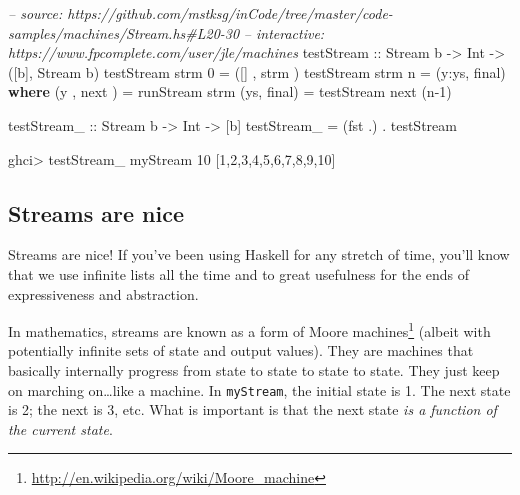 \documentclass[]{article}
\newenvironment{Shaded}{\begin{snugshade}}{\end{snugshade}}
\newcommand{\CommentTok}[1]{\textcolor[rgb]{0.56,0.35,0.01}{\textit{#1}}}
\newcommand{\DataTypeTok}[1]{\textcolor[rgb]{0.13,0.29,0.53}{#1}}
\newcommand{\DecValTok}[1]{\textcolor[rgb]{0.00,0.00,0.81}{#1}}
\newcommand{\FunctionTok}[1]{\textcolor[rgb]{0.00,0.00,0.00}{#1}}
\newcommand{\KeywordTok}[1]{\textcolor[rgb]{0.13,0.29,0.53}{\textbf{#1}}}
\newcommand{\NormalTok}[1]{#1}
\newcommand{\OtherTok}[1]{\textcolor[rgb]{0.56,0.35,0.01}{#1}}
\renewcommand{\href}[2]{#2\footnote{\url{#1}}}
\begin{document}
\begin{Shaded}
\begin{Highlighting}[]
\CommentTok{-- source: https://github.com/mstksg/inCode/tree/master/code-samples/machines/Stream.hs#L20-30}
\CommentTok{-- interactive: https://www.fpcomplete.com/user/jle/machines}
\OtherTok{testStream ::} \DataTypeTok{Stream}\NormalTok{ b }\OtherTok{->} \DataTypeTok{Int} \OtherTok{->}\NormalTok{ ([b], }\DataTypeTok{Stream}\NormalTok{ b)}
\NormalTok{testStream strm }\DecValTok{0} \FunctionTok{=}\NormalTok{ ([]  , strm )}
\NormalTok{testStream strm n }\FunctionTok{=}\NormalTok{ (y}\FunctionTok{:}\NormalTok{ys, final)}
  \KeywordTok{where}
\NormalTok{    (y , next )   }\FunctionTok{=}\NormalTok{ runStream  strm}
\NormalTok{    (ys, final)   }\FunctionTok{=}\NormalTok{ testStream next (n}\FunctionTok{-}\DecValTok{1}\NormalTok{)}

\OtherTok{testStream_ ::} \DataTypeTok{Stream}\NormalTok{ b }\OtherTok{->} \DataTypeTok{Int} \OtherTok{->}\NormalTok{ [b]}
\NormalTok{testStream_ }\FunctionTok{=}\NormalTok{ (fst }\FunctionTok{.}\NormalTok{) }\FunctionTok{.}\NormalTok{ testStream}
\end{Highlighting}
\end{Shaded}

\begin{Shaded}
\begin{Highlighting}[]
\NormalTok{ghci}\FunctionTok{>}\NormalTok{ testStream_ myStream }\DecValTok{10}
\NormalTok{[}\DecValTok{1}\NormalTok{,}\DecValTok{2}\NormalTok{,}\DecValTok{3}\NormalTok{,}\DecValTok{4}\NormalTok{,}\DecValTok{5}\NormalTok{,}\DecValTok{6}\NormalTok{,}\DecValTok{7}\NormalTok{,}\DecValTok{8}\NormalTok{,}\DecValTok{9}\NormalTok{,}\DecValTok{10}\NormalTok{]}
\end{Highlighting}
\end{Shaded}

\hypertarget{streams-are-nice}{%
\subsection{Streams are nice}\label{streams-are-nice}}

Streams are nice! If you've been using Haskell for any stretch of time, you'll
know that we use infinite lists all the time and to great usefulness for the
ends of expressiveness and abstraction.

In mathematics, streams are known as a form of
\href{http://en.wikipedia.org/wiki/Moore_machine}{Moore machines} (albeit with
potentially infinite sets of state and output values). They are machines that
basically internally progress from state to state to state to state. They just
keep on marching on\ldots{}like a machine. In \texttt{myStream}, the initial
state is 1. The next state is 2; the next is 3, etc. What is important is that
the next state \emph{is a function of the current state}.
\end{document}
